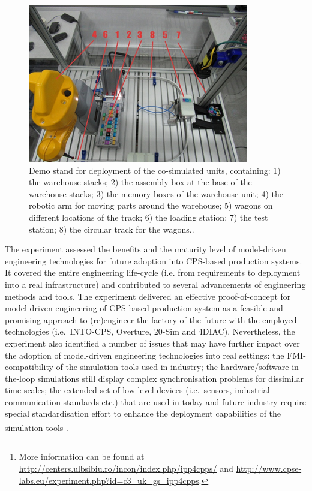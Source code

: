 \begin{figure}[!ht]
	\centering
		\includegraphics[width=0.9 \textwidth]{./figures/demo_stand}
	\caption{Demo stand for deployment of the co-simulated units, containing: 1) the warehouse stacks; 2) the assembly box at the base of the warehouse stacks; 3) the memory boxes of the warehouse unit; 4) the robotic arm for moving parts around the warehouse; 5) wagons on different locations of the track; 6) the loading station; 7) the test station; 8) the circular track for the wagons..}
	\label{fig:demo_stand}
\end{figure}

The experiment assessed the benefits and the maturity level of model-driven engineering technologies for future adoption into CPS-based production systems. It covered the entire engineering life-cycle (i.e. from requirements to deployment into a real infrastructure) and contributed to several advancements of engineering methods and tools. The experiment delivered an effective proof-of-concept for model-driven engineering of CPS-based production system as a feasible and promising approach to (re)engineer the factory of the future with the employed technologies (i.e.\ INTO-CPS, Overture, 20-Sim and 4DIAC). Nevertheless, the experiment also identified a number of issues that may have further impact over the adoption of model-driven engineering technologies into real settings: the FMI-compatibility of the simulation tools used in industry; the hardware/software-in-the-loop simulations still display complex synchronisation problems for dissimilar time-scales; the extended set of low-level devices (i.e.\ sensors, industrial communication standards etc.) that are used in today and future industry require special standardisation effort to enhance the deployment capabilities of the simulation tools\footnote{More information can be found at \url{http://centers.ulbsibiu.ro/incon/index.php/ipp4cpps/} and \url{http://www.cpse-labs.eu/experiment.php?id=c3_uk_gs_ipp4cpps}.}.

